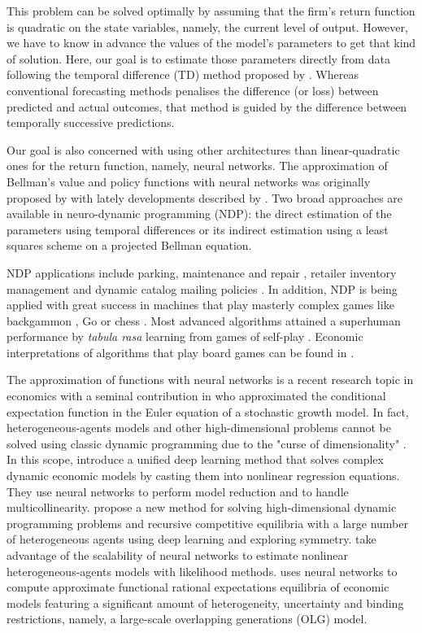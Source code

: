 This problem can be solved optimally by assuming that the firm's return function is quadratic on the state variables, namely, the current level of output. However, we have to know in advance the values of the model's parameters to get that kind of solution. Here, our goal is to estimate those parameters directly from data following the temporal difference (TD) method proposed by \citet{Sutton1988}. Whereas conventional forecasting methods penalises the difference (or loss) between predicted and actual outcomes, that method is guided by the difference between temporally successive predictions.   

Our goal is also concerned with using other architectures than linear-quadratic ones for the return function, namely, neural networks. The approximation of Bellman's value and policy functions with neural networks was originally proposed by \citet{Bertsekas1996} with lately developments described by \citet{Bertsekas2011, Bertsekas2020}. Two broad approaches are available in neuro-dynamic programming (NDP): the direct estimation of the parameters using temporal differences or its indirect estimation using a least squares scheme on a projected Bellman equation.

NDP applications include parking, maintenance and repair \citep{Bertsekas1996}, retailer inventory management \citep{vanRoy1997} and dynamic catalog mailing policies \citep{Mannor2007}. In addition, NDP is being applied with great success in machines that play masterly complex games like backgammon \citep{Tesauro1995}, Go \citep{Silver2016} or chess \citep{Thrun1995, McIlroy2020}. Most advanced algorithms attained a superhuman performance by \emph{tabula rasa} learning from games of self-play \citep{Silver2017}. Economic interpretations of algorithms that play board games can be found in \citet{Igami2020}.

The approximation of functions with neural networks is a recent research topic in economics with a seminal contribution in \citet{Duffy2001} who approximated the conditional expectation function in the Euler equation of a stochastic growth model. In fact, heterogeneous-agents models and other high-dimensional problems cannot be solved using classic dynamic programming due to the "curse of dimensionality" \citep{Bellman1962}. In this scope, \citet{Maliar2021} introduce a unified deep learning method that solves complex dynamic economic models by casting them into nonlinear regression equations. They use neural networks to perform model reduction and to handle multicollinearity. \citet{Kahou2021} propose a new method for solving high-dimensional dynamic programming problems and recursive competitive equilibria with a large number of heterogeneous agents using deep learning and exploring symmetry. \citet{Kase2022} take advantage of the scalability of neural networks to estimate nonlinear heterogeneous-agents models with likelihood methods. \citet{Azinovic2022} uses neural networks to compute approximate functional rational expectations equilibria of economic models featuring a significant amount of heterogeneity, uncertainty and binding restrictions, namely, a large-scale overlapping generations (OLG) model.    

